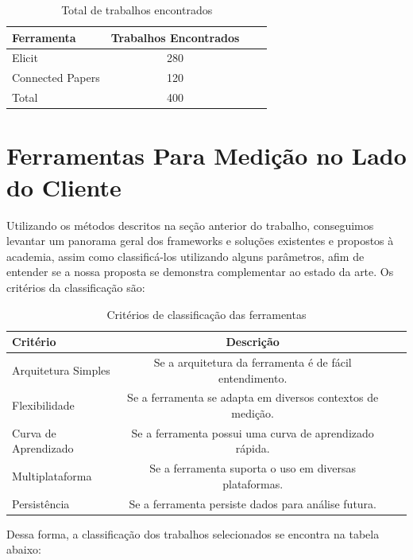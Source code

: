 \documentclass[12pt]{tcc}
\begin{document}
	\begin{table}[!ht]
		\centering
		\caption{Total de trabalhos encontrados}
		\begin{tabular}{l  c L{1.5cm} R{1.5cm}}
			\toprule
			\textbf{Ferramenta} & \textbf{Trabalhos Encontrados} \\
			\midrule
			Elicit  &  280  \\
			Connected Papers  &  120  \\
			\midrule
			Total  &  400  \\
			\bottomrule
		\end{tabular}
		\label{tab:trabalhos-encontrados}
	\end{table}


	\section{Ferramentas Para Medição no Lado do Cliente}
	Utilizando os métodos descritos na seção anterior do trabalho, conseguimos levantar um panorama geral dos frameworks e soluções existentes e propostos à academia, assim como classificá-los utilizando alguns parâmetros, afim de entender se a nossa proposta se demonstra complementar ao estado da arte. 
	Os critérios da classificação são: 


	\begin{table}[!ht]
		\centering
		\caption{Critérios de classificação das ferramentas}
		\begin{tabular}{l c L{1.5cm} R{1.5cm}}
			\toprule
			\textbf{Critério} & \textbf{Descrição}\\
			\midrule 
			Arquitetura Simples & Se a arquitetura da ferramenta é de fácil entendimento.\\
			Flexibilidade&Se a ferramenta se adapta em diversos contextos de medição.\\
			Curva de Aprendizado&Se a ferramenta possui uma curva de aprendizado rápida.\\
			Multiplataforma&Se a ferramenta suporta o uso em diversas plataformas.\\
			Persistência&Se a ferramenta persiste dados para análise futura.\\
			\bottomrule
		\end{tabular}
		\label{tab:string-busca-connected-papers}
	\end{table}


	\par Dessa forma, a classificação dos trabalhos selecionados se encontra na tabela abaixo:
\end{document}

